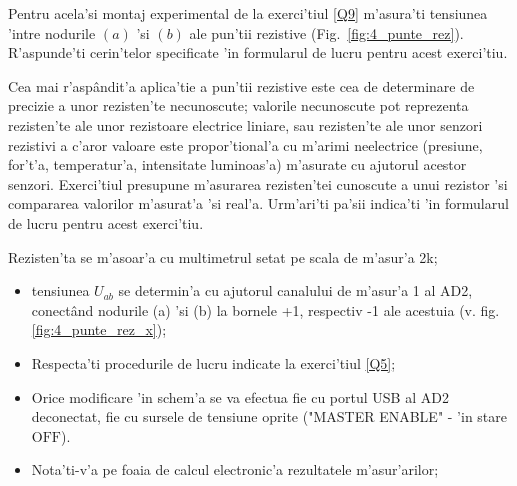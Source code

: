 %
\begin{exercise}  \label{Q11}
Pentru acela'si montaj experimental de la exerci'tiul \ref{Q9} m'asura'ti tensiunea 'intre nodurile $(a)$ 'si $(b)$ ale pun'tii rezistive (Fig.~\ref{fig:4_punte_rez}). R'aspunde'ti cerin'telor specificate 'in formularul de lucru pentru acest exerci'tiu. 
\end{exercise}
%
%
\begin{exercise}  \label{Q12}
Cea mai r'asp\^andit'a aplica'tie a pun'tii rezistive este cea de determinare de precizie a unor rezisten'te necunoscute; valorile necunoscute pot reprezenta rezisten'te ale unor rezistoare electrice liniare, sau rezisten'te ale unor senzori rezistivi a c'aror valoare este propor'tional'a cu m'arimi neelectrice (presiune, for't'a, temperatur'a, intensitate luminoas'a) m'asurate cu ajutorul acestor senzori. Exerci'tiul presupune m'asurarea rezisten'tei cunoscute a unui rezistor 'si compararea valorilor m'asurat'a 'si real'a. Urm'ari'ti pa'sii indica'ti 'in formularul de lucru pentru acest exerci'tiu. 
\end{exercise}
%
\begin{observ}
Rezisten'ta se m'asoar'a cu multimetrul setat pe scala de m'asur'a 2k;
\begin{itemize}
\item tensiunea $U_{ab}$ se determin'a cu ajutorul canalului de m'asur'a 1 al AD2, conect\^and nodurile (a) 'si (b) la bornele +1, respectiv -1 ale acestuia (v. fig. \ref{fig:4_punte_rez_x});
\item {\color{blue} Respecta'ti procedurile de lucru indicate la exerci'tiul \ref{Q5}; } 
\item  
	{\color{blue}
	Orice modificare 'in schem'a se va efectua fie cu portul USB al AD2 deconectat, fie cu sursele de tensiune oprite 
	("MASTER ENABLE" - 'in stare $\mathrm{OFF}$).}
\item Nota'ti-v'a pe foaia de calcul electronic'a rezultatele m'asur'arilor;
\end{itemize}
\end{observ}
%
